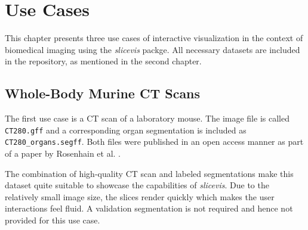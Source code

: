 \chapter{Use Cases}

This chapter presents three use cases of interactive visualization in the context of biomedical imaging using the \emph{slicevis} packge. All necessary datasets are included in the repository, as mentioned in the second chapter. 

\section{Whole-Body Murine CT Scans}
The first use case is a CT scan of a laboratory mouse. The image file is called \texttt{CT280.gff} and a corresponding organ segmentation is included as \texttt{CT280\_organs.segff}. Both files were published in an open access manner as part of a paper by Rosenhain et al. \cite{rosenhain}.

The combination of high-quality CT scan and labeled segmentations make this dataset quite suitable to showcase the capabilities of \emph{slicevis}. Due to the relatively small image size, the slices render quickly which makes the user interactions feel fluid. A validation segmentation is not required and hence not provided for this use case.

